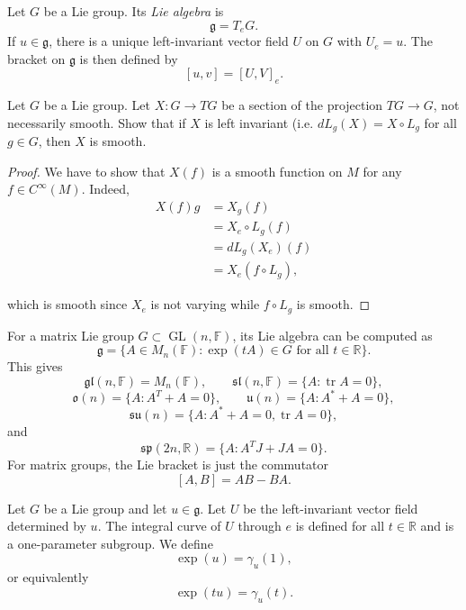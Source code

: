 \begin{definition}
\label{definition-lie-algebra}
Let $G$ be a Lie group. Its {\it Lie algebra}
is
$$
\mathfrak g=T_eG.
$$
If $u\in\mathfrak g$, there is a unique
left-invariant vector field $U$ on $G$ with
$U_e=u$. The bracket on $\mathfrak g$ is
then defined by
$$
[u,v]=[U,V]_e.
$$
\end{definition}

\begin{exercise}
\label{exercise-rough-vector-field}
Let $G$ be a Lie group.
Let $X:G \to TG$ be a section
of the projection $TG \to G$,
not necessarily smooth.
Show that if $X$ is left invariant
(i.e. $dL_g(X)=X \circ L_g$
for all $g \in G$, then $X$ is smooth.
\end{exercise}

\begin{proof}
We have to show that
$X(f)$ is a smooth function on $M$
for any $f \in C^\infty(M)$.
Indeed,
$$
\begin{aligned}
X(f)g&=X_g(f)\\
&=X_e \circ L_g(f)\\
&=dL_g(X_e)(f)\\
&=X_e(f \circ L_g),
\end{aligned}
$$

\noindent
which is smooth since $X_e$
is not varying while
$f \circ L_g$ is smooth.
\end{proof}


\medskip\noindent
For a matrix Lie group $G\subset
\operatorname{GL}(n,\mathbb{F})$, its Lie
algebra can be computed as
$$
\mathfrak g=
\{A\in M_n(\mathbb{F}):\exp(tA)\in G
\text{ for all }t\in\mathbb{R}\}.
$$
This gives
$$
\mathfrak{gl}(n,\mathbb{F})=M_n(\mathbb{F}),
\qquad
\mathfrak{sl}(n,\mathbb{F})=
\{A:\operatorname{tr}A=0\},
$$
$$
\mathfrak{o}(n)=\{A:A^T+A=0\},
\qquad
\mathfrak{u}(n)=\{A:A^*+A=0\},
$$
$$
\mathfrak{su}(n)=
\{A:A^*+A=0,\operatorname{tr}A=0\},
$$
and
$$
\mathfrak{sp}(2n,\mathbb{R})=
\{A:A^TJ+JA=0\}.
$$
For matrix groups, the Lie bracket is just
the commutator
$$
[A,B]=AB-BA.
$$

\begin{definition}
\label{definition-lie-exponential}
Let $G$ be a Lie group and let
$u\in\mathfrak g$. Let $U$ be the
left-invariant vector field determined by
$u$. The integral curve of $U$ through $e$
is defined for all $t\in\mathbb{R}$ and is a
one-parameter subgroup. We define
$$
\exp(u)=\gamma_u(1),
$$
or equivalently
$$
\exp(tu)=\gamma_u(t).
$$
\end{definition}

